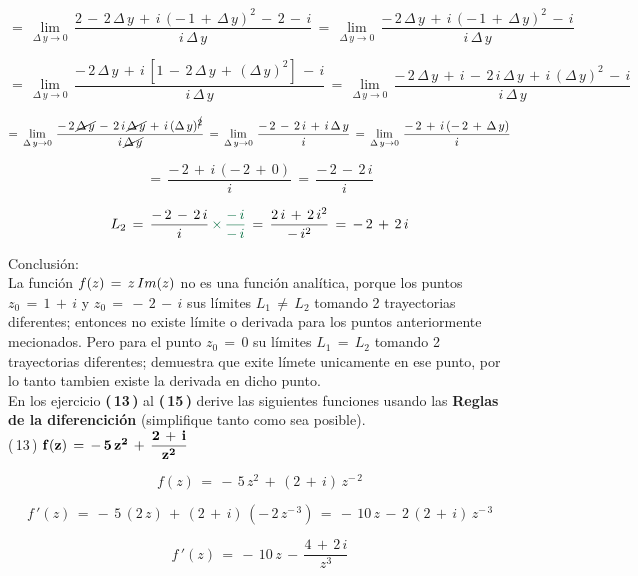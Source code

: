 \documentclass[a4paper,11pt,openany]{book}
\begin{document}
$$=\,\displaystyle\lim_{\Delta\,y \to 0}\,\dfrac{2\,-\,2\,\Delta\,y\,+\,i\,(-\,1\,+\,\Delta\,y)^{2}\,-\,2\,-\,i}{i\,\Delta\,y}\,=\,\displaystyle\lim_{\Delta\,y \to 0}\,\dfrac{-\,2\,\Delta\,y\,+\,i\,(-\,1\,+\,\Delta\,y)^{2}\,-\,i}{i\,\Delta\,y}$$

$$=\,\displaystyle\lim_{\Delta\,y \to 0}\,\dfrac{-\,2\,\Delta\,y\,+\,i\,[1\,-\,2\,\Delta\,y\,+\,(\Delta\,y)^{2}]\,-\,i}{i\,\Delta\,y}\,=\,\displaystyle\lim_{\Delta\,y \to 0}\,\dfrac{-\,2\,\Delta\,y\,+\,i\,-\,2\,i\,\Delta\,y\,+\,i\,(\Delta\,y)^{2}\,-\,i}{i\,\Delta\,y}$$

$$=\,\displaystyle\lim_{\Delta\,y \to 0}\,\dfrac{-\,2\,\cancel{\Delta\,y}\,-\,2\,i\,\cancel{\Delta\,y}\,+\,i\,(\Delta\,y)^{\cancel{2}}}{i\,\cancel{\Delta\,y}}\,=\,\displaystyle\lim_{\Delta\,y \to 0}\,\dfrac{-\,2\,-\,2\,i\,+\,i\,\Delta\,y}{i}\,=\,\displaystyle\lim_{\Delta\,y \to 0}\,\dfrac{-\,2\,+\,i\,(-\,2\,+\,\Delta\,y)}{i}$$

$$=\,\dfrac{-\,2\,+\,i\,(-\,2\,+\,0)}{i}\,=\,\dfrac{-\,2\,-\,2\,i}{i}$$

$$L_{2}\,=\,\dfrac{-\,2\,-\,2\,i}{i}\,\textcolor{cadmiumgreen}{\times\,\dfrac{-\,i}{-\,i}}\,=\,\dfrac{2\,i\,+\,2\,i^{2}}{-\,i^{2}}\,=\,-\,2\,+\,2\,i$$

\textcolor{ao(english)}{} Conclusión:\\

La función $f(z)\,=\,z\,\mathnormal{Im}(z)$ no es una función analítica, porque los puntos $z_{0}\,=\,1\,+\,i$ y $z_{0}\,=\,-\,2\,-\,i$ sus límites $L_{1}\,\neq\,L_{2}$ tomando 2 trayectorias diferentes; entonces no existe límite o derivada para los puntos anteriormente mecionados. Pero para el punto $z_{0}\,=\,0$ su límites $L_{1}\,=\,L_{2}$ tomando 2 trayectorias diferentes; demuestra que exite límete unicamente en ese punto, por lo tanto tambien existe la derivada en dicho punto.\\

En los ejercicio \textbf{(\,13\,)} al \textbf{(\,15\,)} derive las siguientes funciones usando las \textbf{Reglas de la diferencición} (simplifique tanto como sea posible).\\

\textcolor{ao(english)}{(\,13\,)} $\bf{f(z)\,=\,-\,5\,z^{2}\,+\,\dfrac{2\,+\,i}{z^{2}}}$

$$f(z)\,=\,-\,5\,z^{2}\,+\,(2\,+\,i)\,z^{-\,2}$$

$$f\,'(z)\,=\,-\,5\,(2\,z)\,+\,(2\,+\,i)\,(-\,2\,z^{-\,3})\,=\,-\,10\,z\,-\,2\,(2\,+\,i)\,z^{-\,3}$$

$$f\,'(z)\,=\,-\,10\,z\,-\,\dfrac{4\,+\,2\,i}{z^{3}}$$
\end{document}
